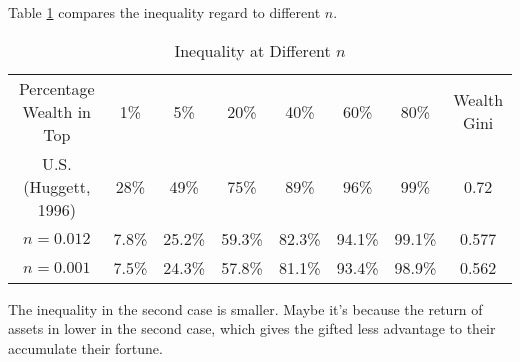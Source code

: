 \documentclass{article}
\begin{document}
	Table \ref{tab:gini2} compares the inequality regard to different $n$.
	
	\begin{table}[h]
		\centering
		\begin{tabular}{c|c|c|c|c|c|c|c}
			Percentage Wealth in Top & 1\% & 5\% & 20\% & 40\% & 60\% & 80\% & Wealth Gini\\
			U.S. (Huggett, 1996) & 28\% & 49\% & 75\% & 89\% & 96\% & 99\% & 0.72\\
			$n=0.012$ & 7.8\% & 25.2\% & 59.3\% & 82.3\% & 94.1\% & 99.1\% & 0.577\\
			$n=0.001$ & 7.5\% & 24.3\% & 57.8\% & 81.1\% & 93.4\% & 98.9\% & 0.562
		\end{tabular}
		\caption{Inequality at Different $n$}
		\label{tab:gini2}
	\end{table}
	The inequality in the second case is smaller.
	Maybe it's because the return of assets in lower in the second case, which gives the gifted less advantage to their accumulate their fortune.
\end{document}
